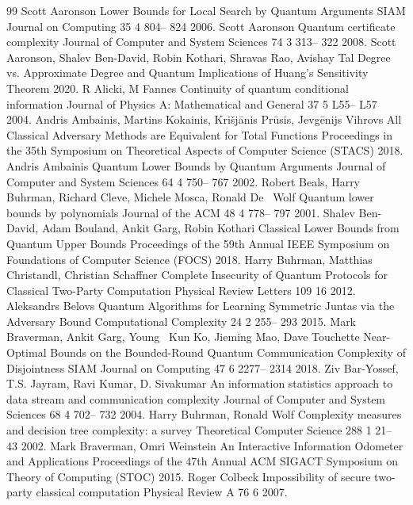 \documentclass[10pt,a4paper]{article}
\theoremstyle{definition}
\renewcommand{\>}{\rangle}
\newcommand{\<}{\langle}
\begin{document}
\begin{thebibliography}{99}
 Scott Aaronson Lower Bounds for Local Search by Quantum Arguments {SIAM} Journal on Computing 35 4 804-- 824 2006.
 Scott Aaronson Quantum certificate complexity Journal of Computer and System Sciences 74 3 313-- 322 2008.
 Scott Aaronson, Shalev Ben-David, Robin Kothari, Shravas Rao, Avishay Tal Degree vs. Approximate Degree and Quantum Implications of Huang's Sensitivity Theorem 2020.
 R Alicki, M Fannes Continuity of quantum conditional information Journal of Physics A: Mathematical and General 37 5 L55-- L57 2004.
 Andris Ambainis, Martins Kokainis, Kri{š}j{ā}nis Pr{ū}sis, Jevg{ē}nijs Vihrovs All Classical Adversary Methods are Equivalent for Total Functions Proceedings in the 35th Symposium on Theoretical Aspects of Computer Science ({STACS}) 2018.
 Andris Ambainis Quantum Lower Bounds by Quantum Arguments Journal of Computer and System Sciences 64 4 750-- 767 2002.
 Robert Beals, Harry Buhrman, Richard Cleve, Michele Mosca, Ronald De~ Wolf Quantum lower bounds by polynomials Journal of the {ACM} 48 4 778-- 797 2001.
 Shalev Ben-David, Adam Bouland, Ankit Garg, Robin Kothari Classical Lower Bounds from Quantum Upper Bounds Proceedings of the 59th Annual {IEEE} Symposium on Foundations of Computer Science ({FOCS}) 2018.
 Harry Buhrman, Matthias Christandl, Christian Schaffner Complete Insecurity of Quantum Protocols for Classical Two-Party Computation Physical Review Letters 109 16 2012.
 Aleksandrs Belovs Quantum Algorithms for Learning Symmetric Juntas via the Adversary Bound Computational Complexity 24 2 255-- 293 2015.
 Mark Braverman, Ankit Garg, Young~ Kun Ko, Jieming Mao, Dave Touchette Near-Optimal Bounds on the Bounded-Round Quantum Communication Complexity of Disjointness {SIAM} Journal on Computing 47 6 2277-- 2314 2018.
 Ziv Bar-Yossef, T.S. Jayram, Ravi Kumar, D. Sivakumar An information statistics approach to data stream and communication complexity Journal of Computer and System Sciences 68 4 702-- 732 2004.
 Harry Buhrman, Ronald Wolf Complexity measures and decision tree complexity: a survey Theoretical Computer Science 288 1 21-- 43 2002.
 Mark Braverman, Omri Weinstein An Interactive Information Odometer and Applications Proceedings of the 47th Annual {ACM} {SIGACT} Symposium on Theory of Computing ({STOC}) 2015.
 Roger Colbeck Impossibility of secure two-party classical computation Physical Review A 76 6 2007.

\end{thebibliography}
\end{document}
